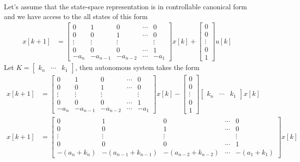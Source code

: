 \documentclass[twoside]{article}
\begin{document}
Let's assume that the state-space representation is in controllable
canonical form and we have access to the all states of this form
%
\begin{align*}
x[k+1] &= \left[ \begin{array}{ccccc} 0 & 1 & 0 & \cdots & 0 \\ 0 & 0 & 1 &
                                                                      \cdots & 0
\\ \vdots & \vdots & \vdots & & \vdots
\\ 0 & 0 & 0 & \cdots & 1
    \\ -a_n & -a_{n-1} & -a_{n-2} & \cdots & -a_1 \end{array} \right] x[k] +
\left[ \begin{array}{c} 0\\ 0 \\ \vdots \\ 0
    \\ 1 \end{array} \right] u[k]
\end{align*}
%
Let $K = \left[ \begin{array}{ccc} k_n & \cdots & k_1 \end{array} \right]$, then
autonomous system takes the form
%
%
\begin{align*}
x[k+1] &= \left[ \begin{array}{ccccc} 0 & 1 & 0 & \cdots & 0 \\ 0 & 0 & 1 &
                                                                      \cdots & 0
\\ \vdots & \vdots & \vdots & & \vdots
\\ 0 & 0 & 0 & \cdots & 1
    \\ -a_n & -a_{n-1} & -a_{n-2} & \cdots & -a_1 \end{array} \right] x[k] -
\left[ \begin{array}{c} 0\\ 0 \\ \vdots \\ 0
    \\ 1 \end{array} \right] 
\left[ \begin{array}{ccc} k_n & \cdots & k_1 \end{array} \right]
x[k]
\\
x[k+1] &= \left[ \begin{array}{ccccc} 0 & 1 & 0 & \cdots & 0 \\ 0 & 0 & 1 &
                                                                      \cdots & 0
\\ \vdots & \vdots & \vdots & & \vdots
\\ 0 & 0 & 0 & \cdots & 1
    \\ -(a_n+k_n) & -(a_{n-1} + k_{n-1}) & -(a_{n-2} + k_{n-2}) &
                                                                  \cdots
                                                         & -(a_1 + k_1) \end{array} \right] x[k]
\end{align*}
\end{document}
